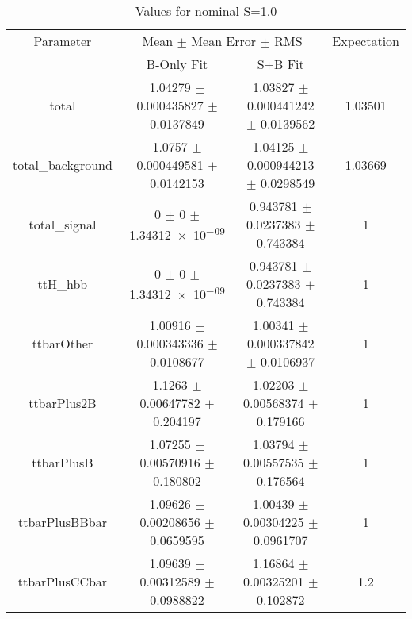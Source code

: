 \begin{table}
\centering
\caption{Values for nominal S=1.0}
\begin{tabular}{cccc}
\toprule
Parameter & \multicolumn{2}{c}{Mean $\pm$ Mean Error $\pm$ RMS} & Expectation\\
 & B-Only Fit & S+B Fit & \\
\midrule
total & \num{1.04279} $\pm$ \num{0.000435827} $\pm$ \num{0.0137849} & \num{1.03827} $\pm$ \num{0.000441242} $\pm$ \num{0.0139562} & \num{1.03501}\\
total\_background & \num{1.0757} $\pm$ \num{0.000449581} $\pm$ \num{0.0142153} & \num{1.04125} $\pm$ \num{0.000944213} $\pm$ \num{0.0298549} & \num{1.03669}\\
total\_signal & \num{0} $\pm$ \num{0} $\pm$ \num{1.34312e-09} & \num{0.943781} $\pm$ \num{0.0237383} $\pm$ \num{0.743384} & \num{1}\\
ttH\_hbb & \num{0} $\pm$ \num{0} $\pm$ \num{1.34312e-09} & \num{0.943781} $\pm$ \num{0.0237383} $\pm$ \num{0.743384} & \num{1}\\
ttbarOther & \num{1.00916} $\pm$ \num{0.000343336} $\pm$ \num{0.0108677} & \num{1.00341} $\pm$ \num{0.000337842} $\pm$ \num{0.0106937} & \num{1}\\
ttbarPlus2B & \num{1.1263} $\pm$ \num{0.00647782} $\pm$ \num{0.204197} & \num{1.02203} $\pm$ \num{0.00568374} $\pm$ \num{0.179166} & \num{1}\\
ttbarPlusB & \num{1.07255} $\pm$ \num{0.00570916} $\pm$ \num{0.180802} & \num{1.03794} $\pm$ \num{0.00557535} $\pm$ \num{0.176564} & \num{1}\\
ttbarPlusBBbar & \num{1.09626} $\pm$ \num{0.00208656} $\pm$ \num{0.0659595} & \num{1.00439} $\pm$ \num{0.00304225} $\pm$ \num{0.0961707} & \num{1}\\
ttbarPlusCCbar & \num{1.09639} $\pm$ \num{0.00312589} $\pm$ \num{0.0988822} & \num{1.16864} $\pm$ \num{0.00325201} $\pm$ \num{0.102872} & \num{1.2}\\
\bottomrule
\end{tabular}
\end{table}